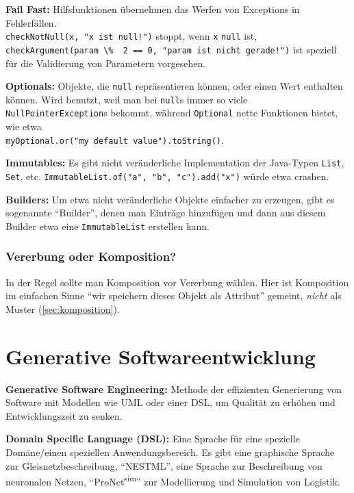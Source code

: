 \documentclass[a4paper,parskip=half*,DIV=7,fontsize=11pt]{scrartcl}
\begin{document}
\textbf{Fail Fast:} Hilfsfunktionen übernehmen das Werfen von Exceptions in Fehlerfällen. \\
\lstinline{checkNotNull(x, "x ist null!")} stoppt, wenn \lstinline{x} \lstinline{null} ist, \\
\lstinline{checkArgument(param \%  2 == 0, "param ist nicht gerade!")} ist speziell für die Validierung von Parametern vorgesehen.

\textbf{Optionals:} Objekte, die \lstinline{null} repräsentieren können, oder einen Wert enthalten können. Wird benutzt, weil man bei \lstinline{null}s immer so viele \lstinline{NullPointerException}s bekommt, während \lstinline{Optional} nette Funktionen bietet, wie etwa \\ \lstinline{myOptional.or("my default value").toString()}.

\textbf{Immutables:} Es gibt nicht veränderliche Implementation der Java-Typen \lstinline{List}, \lstinline{Set}, etc. \lstinline{ImmutableList.of("a", "b", "c").add("x")} würde etwa crashen.

\textbf{Builders:} Um etwa nicht veränderliche Objekte einfacher zu erzeugen, gibt es sogenannte ``Builder'', denen man Einträge hinzufügen und dann aus diesem Builder etwa eine \lstinline{ImmutableList} erstellen kann.

\subsubsection{Vererbung oder Komposition?}

In der Regel sollte man Komposition vor Vererbung wählen. Hier ist Komposition im einfachen Sinne ``wir speichern dieses Objekt als Attribut'' gemeint, \emph{nicht} als Muster (\ref{sec:komposition}).


\section{Generative Softwareentwicklung}
\label{sec:gensoft}

\textbf{Generative Software Engineering:} Methode der effizienten Generierung von Software mit Modellen wie UML oder einer DSL, um Qualität zu erhöhen und Entwicklungszeit zu senken.

\textbf{Domain Specific Language (DSL):} Eine Sprache für eine spezielle Domäne/einen speziellen Anwendungsbereich. Es gibt eine graphische Sprache zur Gleisnetzbeschreibung, ``NESTML'', eine Sprache zur Beschreibung von neuronalen Netzen, ``ProNet\textsuperscript{sim}'' zur Modellierung und Simulation von Logistik.
\end{document}
